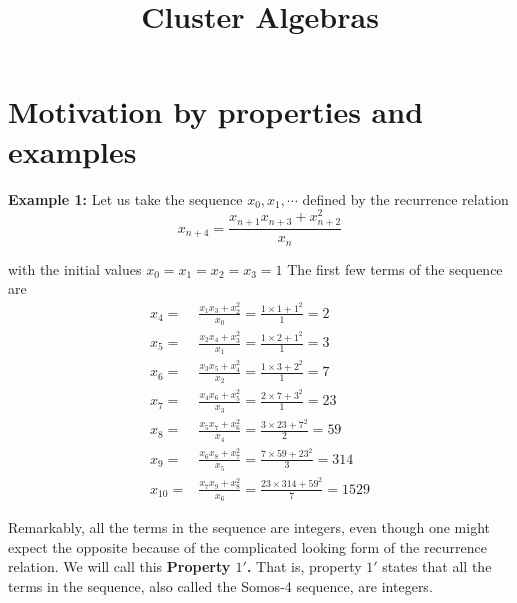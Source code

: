 \documentclass[12pt]{article}
\title{Cluster Algebras}
\begin{document}
\maketitle
\section{Motivation by properties and examples}

\textbf{Example 1: } Let us take the sequence $x_0,x_1, \cdots $ defined  by the recurrence relation 
\[
x_{n+4}=\frac{x_{n+1}x_{n+3}+x_{n+2}^2}{x_n}
\]

with the initial values $x_0=x_1=x_2=x_3=1$
The first few terms of the sequence are 
\begin{align*}
    x_4=&\frac{x_1x_3+x_2^2}{x_0}=\frac{1\times1+1^2}{1}=2\\
    x_5=&\frac{x_2x_4+x_3^2}{x_1}=\frac{1\times2+1^2}{1}=3\\    
    x_6=&\frac{x_3x_5+x_4^2}{x_2}=\frac{1\times3+2^2}{1}=7\\
    x_7=&\frac{x_4x_6+x_5^2}{x_3}=\frac{2\times7 + 3^2}{1}=23\\
    x_8=&\frac{x_5x_7+x_6^2}{x_4}=\frac{3\times 23 + 7^2}{2}=59\\
    x_9=&\frac{x_6x_8+x_7^2}{x_5}=\frac{7\times59+23^2}{3}=314\\
    x_{10}=&\frac{x_7x_9+x_8^2}{x_6}=\frac{23\times314+59^2}{7}=1529
\end{align*}

Remarkably, all the terms in the sequence are integers, even though one might expect the opposite because of the complicated looking form of the recurrence relation. We will call this \textbf{Property $1'$.} That is, property $1'$ states that all the terms in the sequence, also called the Somos-4 sequence, are integers.\\
\end{document}
